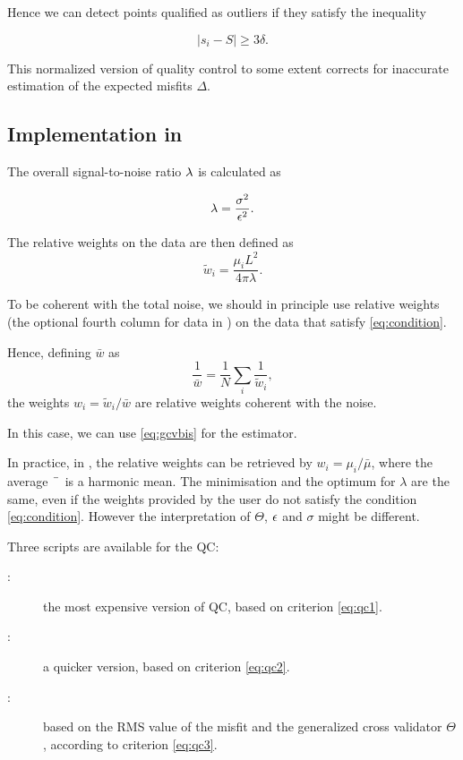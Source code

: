 Hence we can detect points qualified as outliers if they satisfy the inequality

\begin{equation}
|s_i-S | \ge 3 \delta.
\label{eq:qc4}
\end{equation}
 
This normalized version of quality control to some extent corrects for inaccurate estimation of the expected misfits $\Delta$.




\subsection{Implementation in \diva\label{sec:divagcv}}

 The overall signal-to-noise ratio $\lambda$ is calculated as

\begin{equation}
\lambda = \frac{\sigma^2 }{\epsilon^2}.
\end{equation}

The relative weights on the data are then defined as
\begin{equation}
\tilde{w}_i= \frac{\mu_i L^2}{4 \pi \lambda}.
\end{equation}

To be coherent with the total noise, we should in principle use relative weights (the optional fourth column for data in \diva) on the data that satisfy \eqref{eq:condition}.

Hence, defining $\bar{w}$ as
\begin{equation}
\frac{1}{\bar{w}} = \frac{1}{N} \sum_i \frac{1}{\tilde{w}_i},
\end{equation}
the weights $w_i=\tilde{w}_i/\bar{w}$ are relative weights coherent with the noise.

In this case, we can use \eqref{eq:gcvbis} for the estimator.

In practice, in \diva, the relative weights can be retrieved by $w_i=\mu_i/\bar{\mu}$, where
the average $\bar{\hphantom{\mu}}$ is a harmonic mean. The minimisation and the optimum for $\lambda$ are the same, even if the weights provided by the user do not satisfy the condition \eqref{eq:condition}. However the interpretation of $\Theta$, $\epsilon$ and $\sigma$ might be different.

Three scripts are available for the QC:
\begin{description}
\item[:] the most expensive version of QC, based on criterion \eqref{eq:qc1}.
\item[:] a quicker version, based on criterion \eqref{eq:qc2}.
\item[:] based on the RMS value of the misfit and the generalized cross validator $\Theta$, according to criterion \eqref{eq:qc3}.
\end{description}


